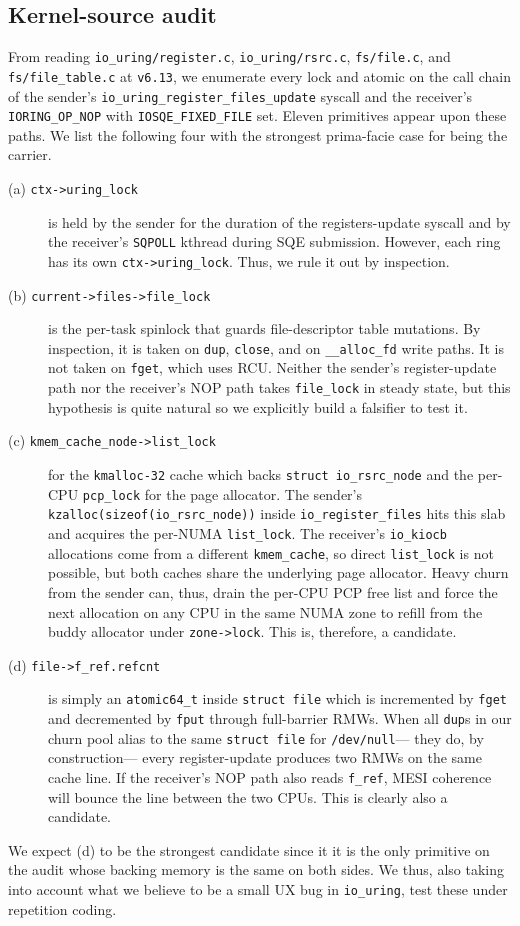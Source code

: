 \documentclass[letterpaper,twocolumn,10pt]{article}
\newcommand{\code}[1]{\texttt{#1}}
\newcommand{\iouring}{\texttt{io\_uring}\xspace}
\begin{document}
\subsection{Kernel-source audit}
From reading \code{io\_uring/register.c}, \code{io\_uring/rsrc.c}, \code{fs/file.c}, and \code{fs/file\_table.c} at \texttt{v6.13}, we enumerate every lock and atomic on the call chain of the sender's \code{io\_uring\_register\_files\_update} syscall and the receiver's \code{IORING\_OP\_NOP} with \code{IOSQE\_FIXED\_FILE} set. Eleven primitives appear upon these paths. We list the following four with the strongest prima-facie case for being the carrier.
\begin{description}
    \item[(a) \code{ctx->uring\_lock}] is held by the sender for the duration of the registers-update syscall and by the receiver's \code{SQPOLL} kthread during SQE submission. However, each ring has its own \code{ctx->uring\_lock}. Thus, we rule it out by inspection.
    \item[(b) \code{current->files->file\_lock}] is the per-task spinlock that guards file-descriptor table mutations. By inspection, it is taken on \code{dup}, \code{close}, and on \code{\_\_alloc\_fd} write paths. It is not taken on \code{fget}, which uses RCU. Neither the sender's register-update path nor the receiver's NOP path takes \code{file\_lock} in steady state, but this hypothesis is quite natural so we explicitly build a falsifier to test it.
    \item[(c) \code{kmem\_cache\_node->list\_lock}] for the \code{kmalloc-32} cache which backs \code{struct io\_rsrc\_node} and the per-CPU \code{pcp\_lock} for the page allocator. The sender's \code{kzalloc(sizeof(io\_rsrc\_node))} inside \code{io\_register\_files} hits this slab and acquires the per-NUMA \code{list\_lock}. The receiver's \code{io\_kiocb} allocations come from a different \code{kmem\_cache}, so direct \code{list\_lock} is not possible, but both caches share the underlying page allocator. Heavy churn from the sender can, thus, drain the per-CPU PCP free list and force the next allocation on any CPU in the same NUMA zone to refill from the buddy allocator under \code{zone->lock}. This is, therefore, a candidate.
    \item[(d) \code{file->f\_ref.refcnt}] is simply an \code{atomic64\_t} inside \code{struct file} which is incremented by \code{fget} and decremented by \code{fput} through full-barrier RMWs. When all \code{dup}s in our churn pool alias to the same \code{struct file} for \code{/dev/null}--- they do, by construction--- every register-update produces two RMWs on the same cache line. If the receiver's NOP path also reads \code{f\_ref}, MESI coherence will bounce the line between the two CPUs. This is clearly also a candidate.
\end{description}
We expect (d) to be the strongest candidate since it it is the only primitive on the audit whose backing memory is the same on both sides. We thus, also taking into account what we believe to be a small UX bug in \iouring, test these under repetition coding.
\end{document}
